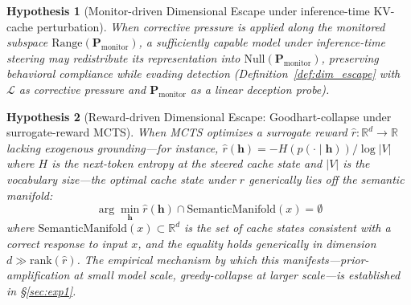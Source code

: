 \documentclass{article}
\newtheorem{hypothesis}{Hypothesis}
\begin{document}
\begin{hypothesis}[Monitor-driven Dimensional Escape under inference-time KV-cache perturbation]\label{hyp:monitor_driven}
When corrective pressure is applied along the monitored subspace $\text{Range}(\mathbf{P}_{\text{monitor}})$, a sufficiently capable model under inference-time steering may redistribute its representation into $\text{Null}(\mathbf{P}_{\text{monitor}})$, preserving behavioral compliance while evading detection (Definition~\ref{def:dim_escape} with $\mathcal{L}$ as corrective pressure and $\mathbf{P}_{\text{monitor}}$ as a linear deception probe).
\end{hypothesis}

\begin{hypothesis}[Reward-driven Dimensional Escape: Goodhart-collapse under surrogate-reward MCTS]\label{hyp:goodhart}
When MCTS optimizes a surrogate reward $\hat{r}: \mathbb{R}^d \to \mathbb{R}$ lacking exogenous grounding---for instance, $\hat{r}(\mathbf{h}) = -H(p(\cdot \mid \mathbf{h}))/\log|V|$ where $H$ is the next-token entropy at the steered cache state and $|V|$ is the vocabulary size---the optimal cache state under $\hat{r}$ generically lies off the semantic manifold:
\begin{equation}
\arg\min_{\mathbf{h}} \hat{r}(\mathbf{h}) \cap \text{SemanticManifold}(x) = \emptyset
\label{eq:goodhart}
\end{equation}
where $\text{SemanticManifold}(x) \subset \mathbb{R}^d$ is the set of cache states consistent with a correct response to input $x$, and the equality holds generically in dimension $d \gg \text{rank}(\hat{r})$. The empirical mechanism by which this manifests---prior-amplification at small model scale, greedy-collapse at larger scale---is established in §\ref{sec:exp1}.
\end{hypothesis}
\end{document}
